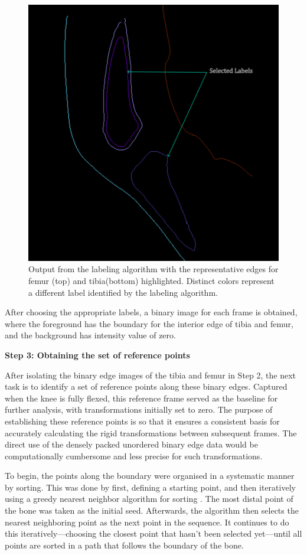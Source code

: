 \documentclass{micro-econ-thesis}
\begin{document}
\begin{figure}[H]
	\centering
	\includegraphics[width=0.7\linewidth]{label_selected}
	\caption{Output from the labeling algorithm with the representative edges for femur (top) and tibia(bottom) highlighted. Distinct colors represent a different label identified by the labeling algorithm.}
	\label{fig:labelimg}
\end{figure}
 
After choosing the appropriate labels, a binary image for each frame is obtained, where the foreground has the boundary for the interior edge of tibia and femur, and the background has intensity value of zero.   

\textbf{Step 3: Obtaining the set of reference points}

After isolating the binary edge images of the tibia and femur in Step 2, the next task is to identify a set of reference points along these binary edges. Captured when the knee is fully flexed, this reference frame served as the baseline for further analysis, with transformations initially set to zero. The purpose of establishing these reference points is so that it ensures a consistent basis for accurately calculating the rigid transformations between subsequent frames. The direct use of the densely packed unordered binary edge data would be computationally cumbersome and less precise for such transformations.

To begin, the points along the boundary were organised in a systematic manner by sorting. This was done by first, defining a starting point, and then iteratively using a greedy nearest neighbor algorithm for sorting \parencite{Hinneburg2000neare-5849}. The most distal point of the bone was taken as the initial seed. Afterwards, the algorithm then selects the nearest neighboring point as the next point in the sequence. It continues to do this iteratively—choosing the closest point that hasn't been selected yet—until all points are sorted in a path that follows the boundary of the bone.
\end{document}
